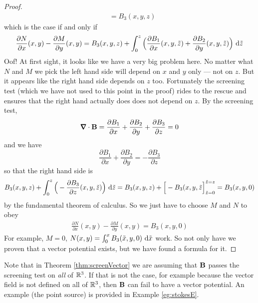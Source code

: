 \begin{proof}
\begin{align*}
&=B_3(x,y,z)
\end{align*}
which is the case if and only if
\begin{align*}
\frac{\partial N}{\partial x}(x,y) -\frac{\partial M}{\partial y}(x,y) =
         B_3(x,y,z) 
         + \int_0^z\Big(\frac{\partial B_1}{\partial x}(x,y,\tilde z) 
         + \frac{\partial B_2}{\partial y}(x,y,\tilde z)\Big)
                            \ \mathrm{d}\tilde z
\end{align*}
Oof! At first sight, it looks like we have a very big problem here.
No matter what $N$ and $M$ we pick the left hand side will depend on $x$ 
and $y$ only --- not on $z$. But it appears like the right hand side
depends on $z$ too. Fortunately the screening test (which we have not used
to this point in the proof) rides to the rescue
and ensures that the right hand actually does does not depend on $z$.
By the screening test,
\begin{equation*}
\vnabla\cdot\vB
=\frac{\partial B_1}{\partial x}
+\frac{\partial B_2}{\partial y}
+\frac{\partial B_3}{\partial z}=0
\end{equation*}
and we have
\begin{equation*}
\frac{\partial B_1}{\partial x}
+\frac{\partial B_2}{\partial y}
=-\frac{\partial B_3}{\partial z}
\end{equation*}
so that the right hand side is
\begin{align*}
         B_3(x,y,z) 
        + \int_0^z\Big(-\frac{\partial B_3}{\partial z}(x,y,\tilde z) \Big)
                                        \ \mathrm{d}\tilde z
       = B_3(x,y,z) +\Big[-B_3(x,y,\tilde z\Big]^{\tilde z=z}_{\tilde z=0}
       =B_3(x,y,0)
\end{align*}
by the fundamental theorem of calculus. So we just have to choose $M$ and $N$ to
obey
\begin{align*}
\frac{\partial N}{\partial x}(x,y) -\frac{\partial M}{\partial y}(x,y) =
         B_3(x,y,0) 
\end{align*}
For example, $M=0$, $N(x,y) = \int _0^x B_3(\tilde x,y,0)\ \dee{\tilde x}$
work. So not only have we proven that a vector potential exists, but we have found a formula for it. 
\end{proof}

\begin{warning}\label{warn:screeningC}
Note that in Theorem \ref{thm:screenVector} we are assuming that
$\mathbf{B}$ passes the screening test on \emph{all} of $\mathbb{R}^3$.
If that is not the case, for example
because the vector field is not defined on all of $\mathbb{R}^3$, then 
$\mathbf{B}$ can fail to have a vector potential. An example (the point source)
is provided in Example \ref{eg:stokesE}.
\end{warning}



